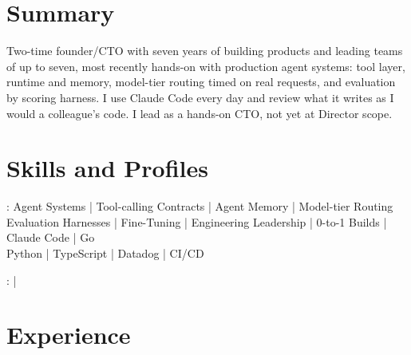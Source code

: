 \documentclass[print]{jack-resume}
\begin{document}
\pagecolor{darkmodeBackground}


\begin{minipage}[t][1cm][t]{.03\textwidth}
    \hfill
\end{minipage}

\section{Summary}
Two-time founder/CTO with seven years of building products and leading teams of up to seven, most recently hands-on with production agent systems: tool layer, runtime and memory, model-tier routing timed on real requests, and evaluation by scoring harness. I use Claude Code every day and review what it writes as I would a colleague's code. I lead as a hands-on CTO, not yet at Director scope.
\sectionsep

\section{Skills and Profiles}
:
Agent Systems \hfill | \hfill
Tool-calling Contracts \hfill | \hfill
Agent Memory \hfill | \hfill
Model-tier Routing \\
\hspace{1.0cm} Evaluation Harnesses \hfill | \hfill
Fine-Tuning \hfill | \hfill
Engineering Leadership \hfill | \hfill
0-to-1 Builds \hfill | \hfill
Claude Code \hfill | \hfill
Go \\
\hspace{1.0cm} Python \hfill | \hfill
TypeScript \hfill | \hfill
Datadog \hfill | \hfill
CI/CD \\

\raggedright{
    :
      \href{https://www.linkedin.com/in/jack-sturtevant/}{ \ExternalLink} |
     \href{https://github.com/jacksturt}{ \ExternalLink}}

\section{Experience}
\end{document}
